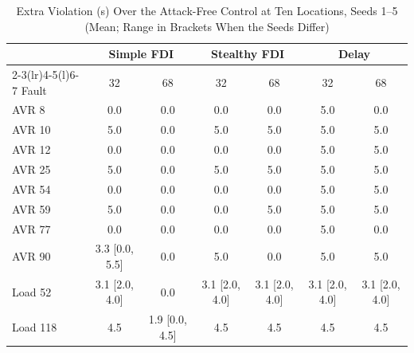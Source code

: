 \begin{table}[t]
\caption{Extra Violation (s) Over the Attack-Free Control at Ten Locations, Seeds 1--5 (Mean; Range in Brackets When the Seeds Differ)}
\label{tab:seeds}
\centering
\footnotesize
\setlength{\tabcolsep}{6pt}
\begin{tabular}{@{}lcccccc@{}}
\toprule
 & \multicolumn{2}{c}{Simple FDI} & \multicolumn{2}{c}{Stealthy FDI} & \multicolumn{2}{c}{Delay} \\
\cmidrule(lr){2-3}\cmidrule(lr){4-5}\cmidrule(l){6-7}
Fault & 32 & 68 & 32 & 68 & 32 & 68 \\
\midrule
AVR 8 & 0.0 & 0.0 & 0.0 & 0.0 & 5.0 & 0.0 \\
AVR 10 & 5.0 & 0.0 & 5.0 & 5.0 & 5.0 & 5.0 \\
AVR 12 & 0.0 & 0.0 & 0.0 & 0.0 & 5.0 & 5.0 \\
AVR 25 & 5.0 & 0.0 & 5.0 & 5.0 & 5.0 & 5.0 \\
AVR 54 & 0.0 & 0.0 & 0.0 & 0.0 & 5.0 & 5.0 \\
AVR 59 & 5.0 & 0.0 & 0.0 & 5.0 & 5.0 & 5.0 \\
AVR 77 & 0.0 & 0.0 & 0.0 & 0.0 & 5.0 & 0.0 \\
AVR 90 & 3.3 [0.0, 5.5] & 0.0 & 5.0 & 0.0 & 5.0 & 5.0 \\
Load 52 & 3.1 [2.0, 4.0] & 0.0 & 3.1 [2.0, 4.0] & 3.1 [2.0, 4.0] & 3.1 [2.0, 4.0] & 3.1 [2.0, 4.0] \\
Load 118 & 4.5 & 1.9 [0.0, 4.5] & 4.5 & 4.5 & 4.5 & 4.5 \\
\bottomrule
\end{tabular}
\end{table}
